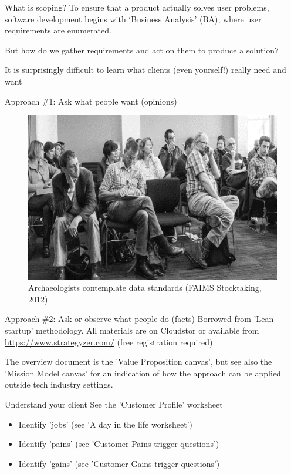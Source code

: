 \documentclass[aspectratio=43, 11pt]{beamer} %
\begin{document}
\begin{frame}{What is scoping?}
To ensure that a product actually solves user problems, software development begins with `Business Analysis' (BA), where user requirements are enumerated. 

But how do we gather requirements and act on them to produce a solution?

It is surprisingly difficult to learn what clients (even yourself!) really need and want
\end{frame}

\begin{frame}{Approach \#1: Ask what people want (opinions)}
 \begin{figure}[Top-down-planning]
    \centering
        \includegraphics[height=.75\textheight]{figures/Archaeologists-standards.png}
        \caption{Archaeologists contemplate data standards (FAIMS Stocktaking, 2012)}
        \label{fig:standards}
    \end{figure}
\end{frame}

\begin{frame}{Approach \#2: Ask or observe what people do (facts)}
    Borrowed from 'Lean startup' methodology. All materials are on Cloudstor or available from \url{https://www.strategyzer.com/} (free registration required)
    
    The overview document is the 'Value Proposition canvas', but see also the 'Mission Model canvas' for an indication of how the approach can be applied outside tech industry settings.
\end{frame}

\begin{frame}{Understand your client}
    See the 'Customer Profile' worksheet
    \begin{itemize}[label=\textbullet]
        \item Identify 'jobs' (see 'A day in the life worksheet')
        \item Identify 'pains' (see 'Customer Pains trigger questions')
        \item Identify 'gains' (see 'Customer Gains trigger questions')
    \end{itemize}
\end{frame}
\end{document}
